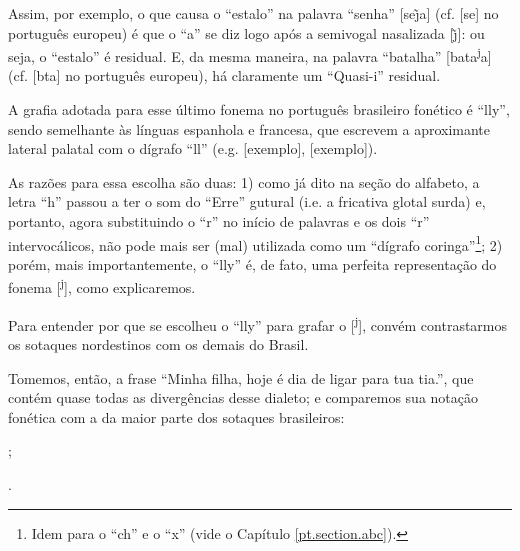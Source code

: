 \documentclass[12pt, a5paper, titlepage]{article}
\begin{document}
Assim, por exemplo, o que causa o ``estalo'' na palavra ``senha'' [\textprimstress se\~\j a] (cf. [\textprimstress se\textltailn\textturna] no português europeu) é que o ``a'' se diz logo após a semivogal nasalizada [\~\j]: ou seja, o ``estalo'' é residual. E, da mesma maneira, na palavra ``batalha'' [ba\textprimstress ta{\textsuperscript{j}}a] (cf. [b\textturna\textprimstress ta\textturny\textturna] no português europeu), há claramente um ``Quasi-i'' residual.

A grafia adotada para esse último fonema no português brasileiro fonético é ``lly'', sendo semelhante às línguas espanhola e francesa, que escrevem a aproximante lateral palatal com o dígrafo ``ll'' (e.g. [exemplo], [exemplo]).

As razões para essa escolha são duas: 1) como já dito na seção do alfabeto, a letra ``h'' passou a ter o som do ``Erre'' gutural (i.e. a fricativa glotal surda) e, portanto, agora substituindo o ``r'' no início de palavras e os dois ``r'' intervocálicos, não pode mais ser (mal) utilizada como um ``dígrafo coringa''\footnote{
    Idem para o ``ch'' e o ``x'' (vide o Capítulo \ref{pt.section.abc}).
}; 2) porém, mais importantemente, o ``lly'' é, de fato, uma perfeita representação do fonema [\textsuperscript{j}], como explicaremos.

Para entender por que se escolheu o ``lly'' para grafar o [\textsuperscript{j}], convém contrastarmos os sotaques nordestinos com os demais do Brasil.

Tomemos, então, a frase ``Minha filha, hoje é dia de ligar para tua tia.'', que contém quase todas as divergências desse dialeto; e comparemos sua notação fonética com a da maior parte dos sotaques brasileiros:
\\
\par[\textprimstress mĩa
    \textprimstress fi\textsubbar{l}\textsuperscript{j}a,
    \textprimstress\textopeno \textyogh i
    \textepsilon \
    \textprimstress dia
    di
    li\textprimstress gah
    \textprimstress pa\textfishhookr a
    \textprimstress tua
    \textprimstress tia.];
\par[\textprimstress mĩa
    \textprimstress fi\textsubbar{l}\textsuperscript{j}a,
    \textprimstress o\textyogh i
    \textepsilon \
    \textprimstress \texttoptiebar{d\textyogh}ia
    \texttoptiebar{d\textyogh}i
    \textsubbar{l}\textsuperscript{j}i\textprimstress gah
    \textprimstress pa\textfishhookr a
    \textprimstress tua
    \textprimstress \texttoptiebar{t\textesh}ia.].
\\
\end{document}
